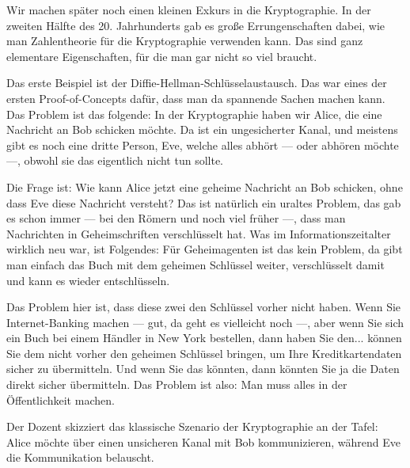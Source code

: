 \begin{spoken-clean}[00:17:11 - 00:20:04]
Wir machen später noch einen kleinen Exkurs in die Kryptographie. In der zweiten Hälfte des 20. Jahrhunderts gab es große Errungenschaften dabei, wie man Zahlentheorie für die Kryptographie verwenden kann. Das sind ganz elementare Eigenschaften, für die man gar nicht so viel braucht.

Das erste Beispiel ist der Diffie-Hellman-Schlüsselaustausch. Das war eines der ersten Proof-of-Concepts dafür, dass man da spannende Sachen machen kann. Das Problem ist das folgende: In der Kryptographie haben wir Alice, die eine Nachricht an Bob schicken möchte. Da ist ein ungesicherter Kanal, und meistens gibt es noch eine dritte Person, Eve, welche alles abhört --- oder abhören möchte ---, obwohl sie das eigentlich nicht tun sollte.

Die Frage ist: Wie kann Alice jetzt eine geheime Nachricht an Bob schicken, ohne dass Eve diese Nachricht versteht? Das ist natürlich ein uraltes Problem, das gab es schon immer --- bei den Römern und noch viel früher ---, dass man Nachrichten in Geheimschriften verschlüsselt hat. Was im Informationszeitalter wirklich neu war, ist Folgendes: Für Geheimagenten ist das kein Problem, da gibt man einfach das Buch mit dem geheimen Schlüssel weiter, verschlüsselt damit und kann es wieder entschlüsseln.

Das Problem hier ist, dass diese zwei den Schlüssel vorher nicht haben. Wenn Sie Internet-Banking machen --- gut, da geht es vielleicht noch ---, aber wenn Sie sich ein Buch bei einem Händler in New York bestellen, dann haben Sie den... können Sie dem nicht vorher den geheimen Schlüssel bringen, um Ihre Kreditkartendaten sicher zu übermitteln. Und wenn Sie das könnten, dann könnten Sie ja die Daten direkt sicher übermitteln. Das Problem ist also: Man muss alles in der Öffentlichkeit machen.
\end{spoken-clean}

\begin{meta-note}
Der Dozent skizziert das klassische Szenario der Kryptographie an der Tafel: Alice möchte über einen unsicheren Kanal mit Bob kommunizieren, während Eve die Kommunikation belauscht.

\begin{center}
\end{center}
\end{meta-note}

